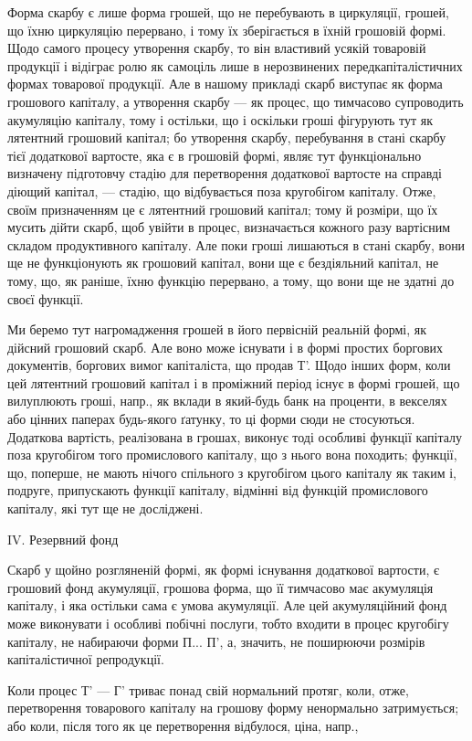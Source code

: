 Форма скарбу є лише форма грошей, що не перебувають в циркуляції,
грошей, що їхню циркуляцію перервано, і тому їх зберігається
в їхній грошовій формі. Щодо самого процесу утворення скарбу, то
він властивий усякій товаровій продукції і відіграє ролю як самоціль
лише в нерозвинених передкапіталістичних формах товарової продукції.
Але в нашому прикладі скарб виступає як форма грошового капіталу, а
утворення скарбу — як процес, що тимчасово супроводить акумуляцію
капіталу, тому і остільки, що і оскільки гроші фігурують тут як
лятентний грошовий капітал; бо утворення скарбу, перебування в стані
скарбу тієї додаткової вартосте, яка є в грошовій формі, являє тут функціонально
визначену підготовчу стадію для перетворення додаткової
вартосте на справді діющий капітал, — стадію, що відбувається поза
кругобігом капіталу. Отже, своїм призначенням це є лятентний грошовий
капітал; тому й розміри, що їх мусить дійти скарб, щоб увійти в
процес, визначається кожного разу вартісним складом продуктивного
капіталу. Але поки гроші лишаються в стані скарбу, вони ще не функціонують
як грошовий капітал, вони ще є бездіяльний капітал, не тому,
що, як раніше, їхню функцію перервано, а тому, що вони ще не здатні
до своєї функції.

Ми беремо тут нагромадження грошей в його первісній реальній
формі, як дійсний грошовий скарб. Але воно може існувати і в
формі простих боргових документів, боргових вимог капіталіста,
що продав Т'. Щодо інших форм, коли цей лятентний грошовий
капітал і в проміжний період існує в формі грошей, що вилуплюють
гроші, напр., як вклади в який-будь банк на проценти, в векселях
або цінних паперах будь-якого ґатунку, то ці форми сюди не стосуються.
Додаткова вартість, реалізована в грошах, виконує тоді особливі функції
капіталу поза кругобігом того промислового капіталу, що з нього
вона походить; функції, що, поперше, не мають нічого спільного з кругобігом
цього капіталу як таким і, подруге, припускають функції капіталу,
відмінні від функцій промислового капіталу, які тут ще не досліджені.

IV. Резервний фонд

Скарб у щойно розгляненій формі, як формі існування додаткової
вартости, є грошовий фонд акумуляції, грошова форма, що її тимчасово
має акумуляція капіталу, і яка остільки сама є умова акумуляції.
Але цей акумуляційний фонд може виконувати і особливі побічні послуги,
тобто входити в процес кругобігу капіталу, не набираючи форми П... П',
а, значить, не поширюючи розмірів капіталістичної репродукції.

Коли процес Т' — Г' триває понад свій нормальний протяг, коли, отже,
перетворення товарового капіталу на грошову форму ненормально затримується;
або коли, після того як це перетворення відбулося, ціна, напр.,
\parbreak{}  %
